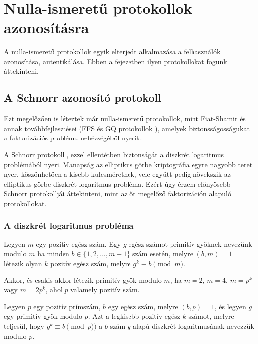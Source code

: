 \chapter{Nulla-ismeretű protokollok azonosításra}

A nulla-ismeretű protokollok egyik elterjedt alkalmazása a felhasználók azonosítása, autentikálása. Ebben a fejezetben ilyen protokollokat fogunk áttekinteni.

\section{A Schnorr azonosító protokoll}

Ezt megelőzően is léteztek már nulla-ismeretű protokollok, mint Fiat-Shamir \cite{FiatShamir} és annak továbbfejlesztései (FFS \cite{FeigeFiatShamir} és GQ protokollok \cite{GuillouQuisquater}), amelyek biztonsságosságukat a faktorizációs probléma nehézségéből nyerik. 

A Schnorr protokoll \cite{Schnorr}, ezzel ellentétben biztonságát a diszkrét logaritmus problémából nyeri. Manapság az elliptikus görbe kriptográfia egyre nagyobb teret nyer, köszönhetően a kisebb kulcsméretnek, vele együtt pedig növekszik az elliptikus görbe diszkrét logaritmus probléma. Ezért úgy érzem előnyösebb Schnorr protokollját áttekinteni, mint az őt megelőző faktorizáción alapuló protokollokat.

\subsection{A diszkrét logaritmus probléma}\cite{BerczesPetho}

\begin{definition}
    Legyen $m$ egy pozitív egész szám. Egy $g$ egész számot primitív gyöknek nevezünk modulo $m$ ha minden $b \in \{1,2,...,m-1\}$ szám esetén, melyre $(b,m) = 1$ létezik olyan $k$ pozitív egész szám, melyre $g^k \equiv b \pmod{m}$.
\end{definition}

\begin{theorem}
    Akkor, és csakis akkor létezik primitív gyök modulo $m$, ha $m = 2$, $m = 4$, $m = p^k$ vagy $m = 2p^k$, ahol $p$ valamely pozitív szám.
\end{theorem}

\begin{definition}
    Legyen $p$ egy pozitív prímszám, $b$ egy egész szám, melyre $(b, p) = 1$, és legyen $g$ egy primitív gyök modulo $p$. Azt a legkisebb pozitív egész $k$ számot, melyre teljesül, hogy $g^k \equiv b \pmod{p})$ a $b$ szám $g$ alapú diszkrét logaritmusának nevezzük modulo $p$.
\end{definition}

